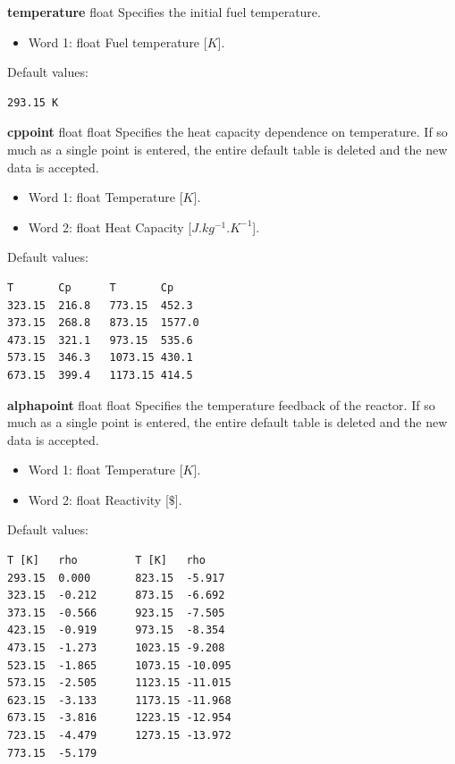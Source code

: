 \documentclass[11pt,letterpaper,titlepage]{article}
\begin{document}
\noindent
\textbf{temperature} {\color{blue} float} \newline
Specifies the initial fuel temperature.
\begin{itemize}
	\item Word 1: {\color{blue} float} Fuel temperature [$K$].
\end{itemize}
Default values:
\begin{verbatim}
293.15 K
\end{verbatim}
\vspace {0.5 cm}


\noindent
\textbf{cppoint} {\color{blue} float float} \newline
Specifies the heat capacity dependence on temperature. If so much as a single point is entered, the entire default table is deleted and the new data is accepted.
\begin{itemize}
	\item Word 1: {\color{blue} float} Temperature [$K$].
	\item Word 2: {\color{blue} float} Heat Capacity [$J.kg^{-1}.K^{-1}$].
\end{itemize}
Default values:
\begin{verbatim}
T       Cp      T       Cp
323.15	216.8	773.15	452.3
373.15	268.8	873.15	1577.0
473.15	321.1	973.15	535.6
573.15	346.3	1073.15	430.1
673.15	399.4	1173.15	414.5
\end{verbatim}
\vspace {0.5 cm}

\newpage
\noindent
\textbf{alphapoint} {\color{blue} float float} \newline
Specifies the temperature feedback of the reactor. If so much as a single point is entered, the entire default table is deleted and the new data is accepted.
\begin{itemize}
	\item Word 1: {\color{blue} float} Temperature [$K$].
	\item Word 2: {\color{blue} float} Reactivity [$\$$].
\end{itemize}
Default values:
\begin{verbatim}
T [K]	rho         T [K]	rho
293.15	0.000       823.15	-5.917
323.15	-0.212      873.15	-6.692
373.15	-0.566      923.15	-7.505
423.15	-0.919      973.15	-8.354
473.15	-1.273      1023.15	-9.208
523.15	-1.865      1073.15	-10.095
573.15	-2.505      1123.15	-11.015
623.15	-3.133      1173.15	-11.968
673.15	-3.816      1223.15	-12.954
723.15	-4.479      1273.15	-13.972
773.15	-5.179
\end{verbatim}
\vspace {0.5 cm}
\end{document}
